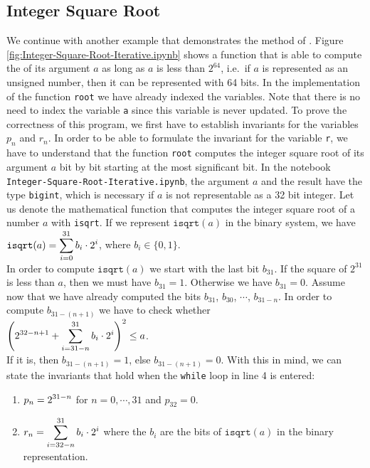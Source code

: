 \subsection{Integer Square Root}
We continue with another example that demonstrates the method of .
Figure \ref{fig:Integer-Square-Root-Iterative.ipynb} shows a function that is able to compute the
 of its argument $a$ as long as $a$ is less than $2^{64}$, i.e.~if $a$ is represented as an unsigned
number, then it can be represented with 64 bits.  In the implementation of the function \texttt{root} we have
already indexed the variables.  Note that there is no 
need to index the variable \texttt{a} since this variable is never updated.  To prove the correctness of this
program, we first 
have to establish invariants for the variables $p_n$ and $r_n$.  In order to be able to formulate the invariant
for the variable \texttt{r}, we have to understand that the function \texttt{root} computes the integer square
root of its argument $a$ bit by bit starting at the most significant bit.  In the notebook
\texttt{Integer-Square-Root-Iterative.ipynb}, the argument $a$ and the result have the type \texttt{bigint}, which
is necessary if $a$ is not representable as a 32 bit integer.  Let us denote the
mathematical function that computes the integer square root of a number $a$ with \texttt{isqrt}.  If we
represent $\mathtt{isqrt}(a)$ in the binary system, we have
\\[0.2cm]
\hspace*{1.3cm}
$\displaystyle \mathtt{isqrt}(a) = \sum\limits_{i=0}^{31} b_i \cdot 2^i$, \quad where $b_i \in \{0,1\}$.
\\[0.2cm]
In order to compute $\mathtt{isqrt}(a)$ we start with the last bit $b_{31}$.  If the square of $2^{31}$ is less
than $a$, then we must have $b_{31} = 1$.  Otherwise we have $b_{31} = 0$.  Assume now that we have already computed the
bits $b_{31}$, $b_{30}$, $\cdots$, $b_{31-n}$.  In order to compute $b_{31-(n+1)}$ we have to check whether
\\[0.2cm]
\hspace*{1.3cm}
$\displaystyle\left(\displaystyle 2^{32-{n+1}} + \sum\limits_{i=31-n}^{31} b_i \cdot 2^i \right)^2 \leq a$.
\\[0.2cm]
If it is, then  $b_{31-(n+1)} = 1$, else $b_{31-(n+1)} = 0$.
With this in mind, we can state the invariants that hold when the \texttt{while} loop in line 4 is entered:
\begin{enumerate}
\item $\displaystyle p_n = 2^{31 - n}$ \quad for $n=0,\cdots,31$ and $p_{32} = 0$.
\item $\displaystyle r_n = \sum\limits_{i=32-n}^{31} b_i \cdot 2^i$ \quad where the $b_i$ are the bits of
      $\mathtt{isqrt}(a)$ in the binary representation.
\end{enumerate}

